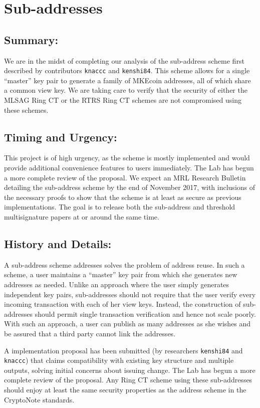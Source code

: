 \documentclass[12pt,english]{mrl}
\theoremstyle{definition}
\numberwithin{equation}{section}
\numberwithin{figure}{section}
\numberwithin{equation}{section}
\numberwithin{equation}{section}
\numberwithin{figure}{section}
\begin{document}
\section{Sub-addresses}


\subsection{Summary:} 

We are in the midst of completing our analysis of the sub-address scheme first described by contributors \texttt{knaccc} and \texttt{kenshi84}. This scheme allows for a single ``master'' key pair to generate a family of MKEcoin addresses, all of which share a common view key. We are taking care to verify that the security of either the MLSAG Ring CT or the RTRS Ring CT schemes are not compromised using these schemes.

\subsection{Timing and Urgency:} 

This project is of high urgency, as the scheme is mostly implemented and would provide additional convenience features to users immediately. The Lab has begun a more complete review of the proposal. We expect an MRL Research Bulletin detailing the sub-address scheme by the end of November 2017, with inclusions of the necessary proofs to show that the scheme is at least as secure as previous implementations. The goal is to release both the sub-address and threshold multisignature papers at or around the same time.

\subsection{History and Details:} 

A sub-address scheme addresses solves the problem of address reuse. In such a scheme, a user maintains a ``master'' key pair from which she generates new addresses as needed. Unlike an approach where the user simply generates independent key pairs, sub-addresses should not require that the user verify every incoming transaction with each of her view keys. Instead, the construction of sub-addresses should permit single transaction verification and hence not scale poorly. With such an approach, a user can publish as many addresses as she wishes and be assured that a third party cannot link the addresses. 

A implementation proposal has been submitted (by researchers \texttt{kenshi84} and \texttt{knaccc}) that claims compatibility with existing key structure and multiple outputs, solving initial concerns about issuing change. The Lab has begun a more complete review of the proposal. Any Ring CT scheme using these sub-addresses should enjoy at least the same security properties as the address scheme in the CryptoNote standards. 
\end{document}
